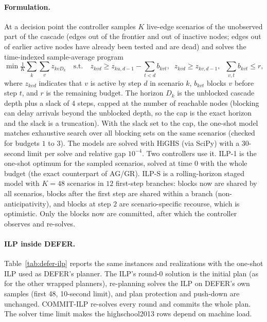 \documentclass[11pt]{article}
\theoremstyle{definition}
\theoremstyle{remark}
\begin{document}
\paragraph{Formulation.} At a decision point the controller samples $K$
live-edge scenarios of the unobserved part of the cascade (edges out of the
frontier and out of inactive nodes; edges out of earlier active nodes have
already been tested and are dead) and solves the time-indexed sample-average
program
\[
\min \tfrac1K\sum_k\sum_v z_{kvD_k}\quad\text{s.t.}\quad
z_{kvd}\ge z_{ku,d-1}-\sum_{t<d}b_{kvt},\;\; z_{kvd}\ge z_{kv,d-1},\;\;
\sum_{v,t}b_{kvt}\le r,
\]
where $z_{kvd}$ indicates that $v$ is active by step $d$ in scenario $k$,
$b_{kvt}$ blocks $v$ before step $t$, and $r$ is the remaining budget. The
horizon $D_k$ is the unblocked cascade depth plus a slack of 4 steps, capped at
the number of reachable nodes (blocking can delay arrivals beyond the unblocked
depth, so the cap is the exact horizon and the slack is a truncation). With
the slack set to the cap, the one-shot model matches exhaustive search over all
blocking sets on the same scenarios (checked for budgets
$1$ to $3$). The models are solved with HiGHS (via SciPy) with a 30-second limit per
solve and relative gap $10^{-4}$. Two controllers use it.
ILP-1 is the one-shot optimum for the sampled scenarios, solved at time
$0$ with the whole budget (the exact counterpart of AG/GR).
ILP-S is a rolling-horizon staged model with $K=48$ scenarios in
$12$ first-step branches: blocks now are shared by all scenarios, blocks after
the first step are shared within a branch (non-anticipativity), and blocks at
step $2$ are scenario-specific recourse, which is optimistic. Only the blocks
now are committed, after which the controller observes and re-solves.

\paragraph{ILP inside DEFER.} Table~\ref{tab:defer-ilp} reports the same
instances and realizations with the one-shot ILP used as DEFER's planner. The
ILP's round-0 solution is the initial plan (as for the other wrapped planners),
re-planning solves the ILP on DEFER's own samples (first 48, 10-second limit),
and plan protection and push-down are unchanged. COMMIT-ILP re-solves
every round and commits the whole plan. The solver time limit makes the
highschool2013 rows depend on machine load.
\end{document}
